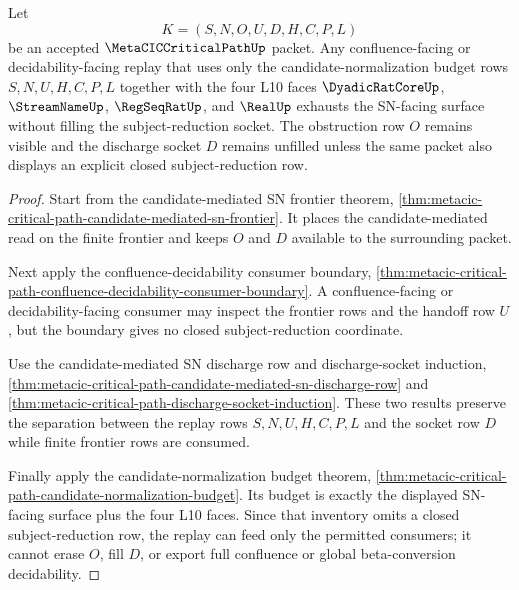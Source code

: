 \begin{theorem}
\label{thm:metacic-critical-path-candidate-normalization-socket-exhaustion}
Let
$$
K=(S,N,O,U,D,H,C,P,L)
$$
be an accepted $\MetaCICCriticalPathUp$ packet. Any confluence-facing or decidability-facing replay that uses only the candidate-normalization budget rows $S,N,U,H,C,P,L$ together with the four L10 faces $\DyadicRatCoreUp$, $\StreamNameUp$, $\RegSeqRatUp$, and $\RealUp$ exhausts the SN-facing surface without filling the subject-reduction socket. The obstruction row $O$ remains visible and the discharge socket $D$ remains unfilled unless the same packet also displays an explicit closed subject-reduction row.
\end{theorem}
\begin{proof}
Start from the candidate-mediated SN frontier theorem, \autoref{thm:metacic-critical-path-candidate-mediated-sn-frontier}. It places the candidate-mediated read on the finite frontier and keeps $O$ and $D$ available to the surrounding packet.

Next apply the confluence-decidability consumer boundary, \autoref{thm:metacic-critical-path-confluence-decidability-consumer-boundary}. A confluence-facing or decidability-facing consumer may inspect the frontier rows and the handoff row $U$, but the boundary gives no closed subject-reduction coordinate.

Use the candidate-mediated SN discharge row and discharge-socket induction, \autoref{thm:metacic-critical-path-candidate-mediated-sn-discharge-row} and \autoref{thm:metacic-critical-path-discharge-socket-induction}. These two results preserve the separation between the replay rows $S,N,U,H,C,P,L$ and the socket row $D$ while finite frontier rows are consumed.

Finally apply the candidate-normalization budget theorem, \autoref{thm:metacic-critical-path-candidate-normalization-budget}. Its budget is exactly the displayed SN-facing surface plus the four L10 faces. Since that inventory omits a closed subject-reduction row, the replay can feed only the permitted consumers; it cannot erase $O$, fill $D$, or export full confluence or global beta-conversion decidability.
\end{proof}

